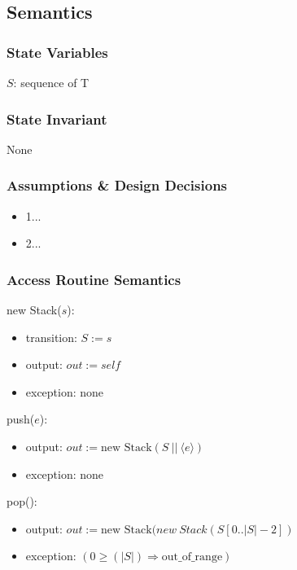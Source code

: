 \documentclass[12pt]{article}
\begin{document}
\subsection* {Semantics}

\subsubsection* {State Variables}

$S$: sequence of T \\

\subsubsection* {State Invariant}

None

\subsubsection* {Assumptions \& Design Decisions}

\begin{itemize}
\item 1...
\item 2...
\end{itemize}

\subsubsection* {Access Routine Semantics}

new Stack($s$):
\begin{itemize}
\item transition: $S := s$

\item output: $\mathit{out} := \mathit{self}$
\item exception: none
\end{itemize}

\noindent push($e$):
\begin{itemize}
\item output: $out := \text{new Stack}(S\ ||\ \langle e \rangle)$
\item exception: none
\end{itemize}

\noindent pop():
\begin{itemize}
  \item output: $out := \text{new Stack}(new \  Stack( S[0..|S| - 2])$ \\

\item exception: $( 0 \geq (|S|) \Rightarrow \text{out\_of\_range})$    \\

\end{itemize}
\end{document}
